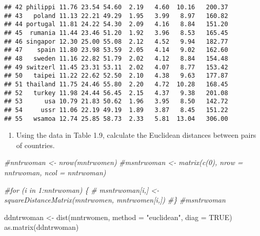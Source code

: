 \documentclass[
]{article}
\newenvironment{Shaded}{\begin{snugshade}}{\end{snugshade}}
\newcommand{\AttributeTok}[1]{\textcolor[rgb]{0.77,0.63,0.00}{#1}}
\newcommand{\CommentTok}[1]{\textcolor[rgb]{0.56,0.35,0.01}{\textit{#1}}}
\newcommand{\ConstantTok}[1]{\textcolor[rgb]{0.00,0.00,0.00}{#1}}
\newcommand{\FunctionTok}[1]{\textcolor[rgb]{0.00,0.00,0.00}{#1}}
\newcommand{\NormalTok}[1]{#1}
\newcommand{\OtherTok}[1]{\textcolor[rgb]{0.56,0.35,0.01}{#1}}
\newcommand{\StringTok}[1]{\textcolor[rgb]{0.31,0.60,0.02}{#1}}
\providecommand{\tightlist}{%
  \setlength{\itemsep}{0pt}\setlength{\parskip}{0pt}}
\begin{document}
\begin{verbatim}
## 42 philippi 11.76 23.54 54.60  2.19   4.60  10.16   200.37
## 43   poland 11.13 22.21 49.29  1.95   3.99   8.97   160.82
## 44 portugal 11.81 24.22 54.30  2.09   4.16   8.84   151.20
## 45  rumania 11.44 23.46 51.20  1.92   3.96   8.53   165.45
## 46 singapor 12.30 25.00 55.08  2.12   4.52   9.94   182.77
## 47    spain 11.80 23.98 53.59  2.05   4.14   9.02   162.60
## 48   sweden 11.16 22.82 51.79  2.02   4.12   8.84   154.48
## 49 switzerl 11.45 23.31 53.11  2.02   4.07   8.77   153.42
## 50   taipei 11.22 22.62 52.50  2.10   4.38   9.63   177.87
## 51 thailand 11.75 24.46 55.80  2.20   4.72  10.28   168.45
## 52   turkey 11.98 24.44 56.45  2.15   4.37   9.38   201.08
## 53      usa 10.79 21.83 50.62  1.96   3.95   8.50   142.72
## 54     ussr 11.06 22.19 49.19  1.89   3.87   8.45   151.22
## 55   wsamoa 12.74 25.85 58.73  2.33   5.81  13.04   306.00
\end{verbatim}

\begin{enumerate}
\def\labelenumi{(\alph{enumi})}
\tightlist
\item
  Using the data in Table 1.9, calculate the Euclidean distances between
  pairs of countries.
\end{enumerate}

\begin{Shaded}
\begin{Highlighting}[]
\CommentTok{\#nntrwoman \textless{}{-} nrow(mntrwomen)}
\CommentTok{\#msntrwoman \textless{}{-} matrix(c(0), nrow = nntrwoman, ncol = nntrwoman)}

\CommentTok{\#for (i in 1:nntrwoman) \{}
\CommentTok{\#  msntrwoman[i,] \textless{}{-} squareDistanceMatrix(mntrwomen, mntrwomen[i,])  }
\CommentTok{\#\}}
\CommentTok{\#msntrwoman}

\NormalTok{ddntrwoman }\OtherTok{\textless{}{-}} \FunctionTok{dist}\NormalTok{(mntrwomen, }\AttributeTok{method =} \StringTok{"euclidean"}\NormalTok{, }\AttributeTok{diag =} \ConstantTok{TRUE}\NormalTok{)}
\FunctionTok{as.matrix}\NormalTok{(ddntrwoman)}
\end{Highlighting}
\end{Shaded}
\end{document}
